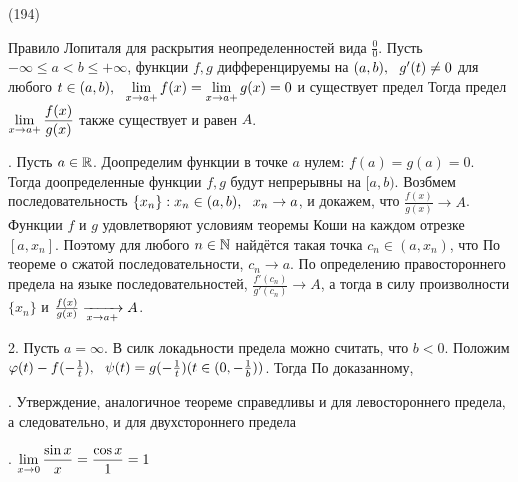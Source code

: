 (194)

\T \q Правило Лопиталя для раскрытия неопределенностей вида $\frac 00$. Пусть $-\infty \le a < b \le +\infty$, функции $f, g$ дифференцируемы на $(a, b),\ \  g'(t) \neq 0$ для любого $t \in (a, b),\ \  \displaystyle \lim\limits^{}_{x \to a+} f(x) = \displaystyle \lim\limits^{}_{x \to a+} g(x) = 0$ и существует предел  Тогда предел $\displaystyle \lim\limits^{}_{x \to a+} \frac{f(x)}{g(x)}$ также существует и равен $A$.

. Пусть $a \in \mathbb{R}$. Доопределим функции в точке $a$ нулем: $f(a) = g(a) = 0$. Тогда доопределенные функции $f, g$ будут непрерывны на $[a, b)$. Возбмем последовательность $\{x_n\}: x_n \in (a, b),\ \  x_n \to a$, и докажем, что $\frac{f(x)}{g(x)} \to A$. Функции $f$ и $g$ удовлетворяют условиям теоремы Коши на каждом отрезке $[a, x_n]$. Поэтому для любого $n \in \mathbb{N}$ найдётся такая точка $c_n \in (a, x_n)$, что  По теореме о сжатой последовательности, $c_n \to a$. По определению правостороннего предела на языке последовательностей, $\frac{f'(c_n)}{g'(c_n)} \to A$, а тогда  в силу произволности $\{x_n\}$ и $\frac{f(x)}{g(x)} \xrightarrow[x \to a+]{} A$.

2. Пусть $a = \infty$. В силк локадьности предела можно считать, что $b < 0$. Положим $\varphi(t) - f(-\frac 1t),\ \  \psi(t) = g(-\frac 1t) (t \in (0, -\frac 1b))$. Тогда 
  По доказанному, 

. Утверждение, аналогичное теореме справедливы и для левостороннего предела, а следовательно, и для двухстороннего предела

. $\displaystyle \lim\limits^{}_{x \to 0}\frac{\sin x}{x} = \frac{\cos x}1 = 1$